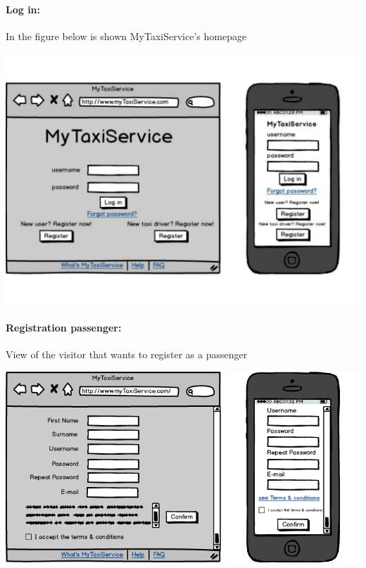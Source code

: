\paragraph{Log in:}
In the figure below is shown MyTaxiService's homepage
\begin{center}
	\includegraphics[width=\textwidth]{mockup/login1.pdf}
\end{center}

\paragraph{Registration passenger:}
View of the visitor that wants to register as a passenger
\begin{center}
	\includegraphics[width=\textwidth]{mockup/registrationPassenger.png}
\end{center}

